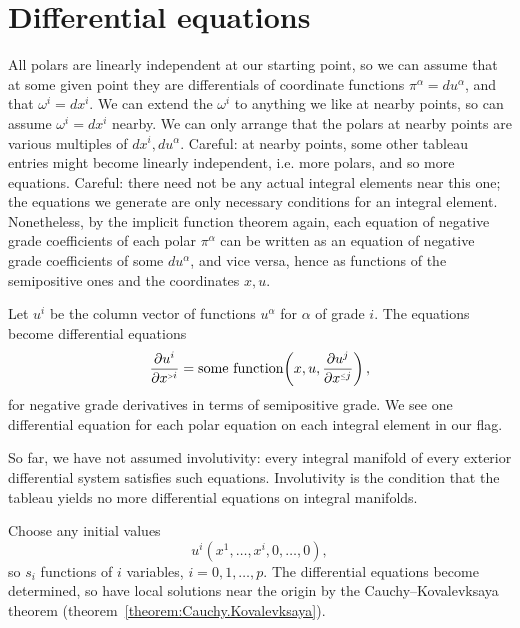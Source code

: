 \section{Differential equations}
All polars are linearly independent at our starting point, so we can assume that at some given point they are differentials of coordinate functions \(\pi^{\alpha}=du^{\alpha}\), and that \(\omega^i=dx^i\).
We can extend the \(\omega^i\) to anything we like at nearby points, so can assume \(\omega^i=dx^i\) nearby.
We can only arrange that the polars at nearby points are various multiples of \(dx^i,du^{\alpha}\).
Careful: at nearby points, some other tableau entries might become linearly independent, i.e. more polars, and so more equations.
Careful: there need not be any actual integral elements near this one; the equations we generate are only necessary conditions for an integral element.
Nonetheless, by the implicit function theorem again, each equation of negative grade coefficients of each polar \(\pi^{\alpha}\) can be written as an equation of negative grade coefficients of some \(du^{\alpha}\), and vice versa, hence as functions of the semipositive ones and the coordinates \(x,u\).

Let \(u^i\) be the column vector of functions \(u^{\alpha}\) for \(\alpha\) of grade \(i\).
The equations become differential equations
\[
\pderiv{u^i}{x^{\ggr{i}}}=\text{some function}\of{x,u,\pderiv{u^j}{x^{\legr{j}}}},
\]
for negative grade derivatives in terms of semipositive grade.
We see one differential equation for each polar equation on each integral element in our flag.

So far, we have not assumed involutivity: every integral manifold of every exterior differential system satisfies such equations.
Involutivity is the condition that the tableau yields no more differential equations on integral manifolds.

Choose\label{page:pdes} any initial values
\[
u^i(x^1,\dots,x^i,0,\dots,0),
\]
so \(s_i\) functions of \(i\) variables, \(i=0,1,\dots,p\).
The differential equations become determined, so have local solutions near the origin by the Cauchy--Kovalevksaya theorem (theorem~\vref{theorem:Cauchy.Kovalevksaya}).

